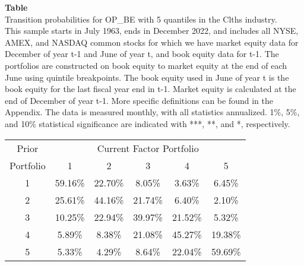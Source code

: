 \begin{table*}[ht!]
\raggedright
{}
\label{tab: transition_probs_OP_BE_Clths_with_5_quantiles}
\textbf{Table \thetable} \\
Transition probabilities for OP_BE with 5 quantiles in the Clths industry. \\
\hspace*{1em}This sample starts in July 1963, ends in December 2022, and includes all NYSE, AMEX, and NASDAQ common stocks for which we have market equity data for December of year t-1 and June of year t, and book equity data for t-1. The portfolios are constructed on book equity to market equity at the end of each June using quintile breakpoints.  The book equity used in June of year t is the book equity for the last fiscal year end in t-1.  Market equity is calculated at the end of December of year t-1.  More specific definitions can be found in the Appendix.  The data is measured monthly, with all statistics annualized.  1\%, 5\%, and 10\% statistical significance are indicated with ***, **, and *, respectively. \\
\vspace{0.5em}
\centering
\begin{adjustbox}{max width=\textwidth}
\begin{tabular}{@{}cccccc@{}}
\toprule
Prior & \multicolumn{5}{c}{Current Factor Portfolio} \\
Portfolio & 1 & 2 & 3 & 4 & 5 \\
\midrule
1 & 59.16\% & 22.70\% & 8.05\% & 3.63\% & 6.45\% \\
2 & 25.61\% & 44.16\% & 21.74\% & 6.40\% & 2.10\% \\
3 & 10.25\% & 22.94\% & 39.97\% & 21.52\% & 5.32\% \\
4 & 5.89\% & 8.38\% & 21.08\% & 45.27\% & 19.38\% \\
5 & 5.33\% & 4.29\% & 8.64\% & 22.04\% & 59.69\% \\
\bottomrule
\end{tabular}
\end{adjustbox}
\end{table*}